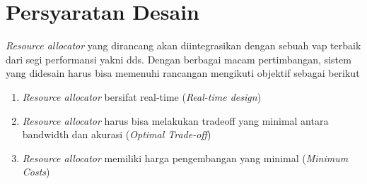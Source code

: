 


    
    

\section{Persyaratan Desain}
    \textit{Resource allocator} yang dirancang akan diintegrasikan dengan sebuah \gls{vap} terbaik dari segi performansi yakni \gls{dds}.
    Dengan berbagai macam pertimbangan, sistem yang didesain harus bisa memenuhi rancangan mengikuti objektif sebagai berikut
    \begin{enumerate}
        \item \textit{Resource allocator} bersifat real-time (\textit{Real-time design})
        \item \textit{Resource allocator} harus bisa melakukan tradeoff yang minimal antara bandwidth dan akurasi (\textit{Optimal Trade-off})
        \item \textit{Resource allocator} memiliki harga pengembangan yang minimal (\textit{Minimum Costs})
    \end{enumerate}

